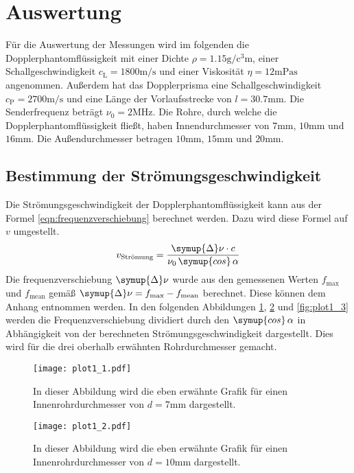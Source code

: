 \section{Auswertung}
\label{sec:Auswertung}
Für die Auswertung der Messungen wird im folgenden die Dopplerphantomflüssigkeit mit einer Dichte $\rho = 1.15 \unit{\gram\per\cubic\centi\metre}$, einer 
Schallgeschwindigkeit $c_\text{L} = 1800 \unit{\metre\per\second}$ und einer Viskosität $\eta = 12 \unit{\milli\pascal\second}$ angenommen. Außerdem hat das Dopplerprisma
eine Schallgeschwindigkeit $c_\text{P} = 2700 \unit{\metre\per\second}$ und eine Länge der Vorlaufsstrecke von $l = 30.7 \unit{\milli\metre}$. Die Senderfrequenz beträgt 
$\nu_0 = 2\unit{\mega\hertz}$. Die Rohre, durch welche die Dopplerphantomflüssigkeit fließt, haben Innendurchmesser von $7 \unit{\milli\metre}$, $10 \unit{\milli\metre}$
und $16 \unit{\milli\metre}$. Die Außendurchmesser betragen $10 \unit{\milli\metre}$, $15 \unit{\milli\metre}$ und $20 \unit{\milli\metre}$.
\subsection{Bestimmung der Strömungsgeschwindigkeit}
Die Strömungsgeschwindigkeit der Dopplerphantomflüssigkeit kann aus der Formel \eqref{eqn:frequenzverschiebung} berechnet werden. Dazu wird diese Formel auf $v$ umgestellt.
\begin{equation*}
  v_\text{Strömung} = \frac{\symup{\Delta}\nu\cdot c}{\nu_0\,\symup{cos}\,\alpha} 
\end{equation*}
Die frequenzverschiebung $\symup{\Delta}\nu$ wurde aus den gemessenen Werten $f_\text{max}$ und $f_\text{mean}$ gemäß $\symup{\Delta}\nu = f_\text{max} - f_\text{mean}$ berechnet.
Diese können dem Anhang entnommen werden.
In den folgenden Abbildungen \ref{fig:plot1_1}, \ref{fig:plot1_2} und \ref{fig:plot1_3} werden die Frequenzverschiebung dividiert durch den $\symup{cos}\,\alpha$ in 
Abhängigkeit von der berechneten Strömungsgeschwindigkeit dargestellt. Dies wird für die drei oberhalb erwähnten Rohrdurchmesser gemacht.
\begin{figure}
  \centering
  \texttt{[image: plot1\_1.pdf]}
  \caption{In dieser Abbildung wird die eben erwähnte Grafik für einen Innenrohrdurchmesser  von $d = 7 \unit{\milli\metre}$ dargestellt.}
  \label{fig:plot1_1}
\end{figure}

\begin{figure}
  \centering
  \texttt{[image: plot1\_2.pdf]}
  \caption{In dieser Abbildung wird die eben erwähnte Grafik für einen Innenrohrdurchmesser  von $d = 10 \unit{\milli\metre}$ dargestellt.}
  \label{fig:plot1_2}
\end{figure}

